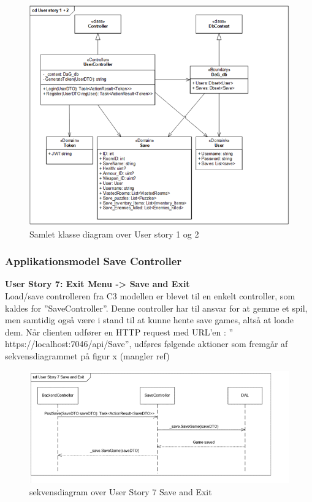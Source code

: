\begin{figure}[h]
\centering
\includegraphics[width = \textwidth]{02-Body/Images/Backend_klasse_1_2.PNG}
\caption{Samlet klasse diagram over User story 1 og 2}
\label{fig:Arkitektur-Backend-Klasse-1-2}
\end{figure}

\subsubsection{Applikationsmodel Save Controller}
\textbf{User Story 7: Exit Menu -> Save and Exit}\\
Load/save controlleren fra C3 modellen er blevet til en enkelt controller, som kaldes for ”SaveController”. Denne controller har til ansvar for at gemme et spil, men samtidig også være i stand til at kunne hente save games, altså at loade dem.
Når clienten udfører en HTTP request med URL’en : ” https://localhost:7046/api/Save”, udføres følgende aktioner som fremgår af sekvensdiagrammet på figur x (mangler ref)\\

\begin{figure}[h]
\centering
\includegraphics[width = \textwidth]{02-Body/Images/Backend_sekvens_7.PNG}
\caption{sekvensdiagram over User Story 7 Save and Exit}
\label{fig:Arkitektur-Backend-Sekvens-7}
\end{figure}


